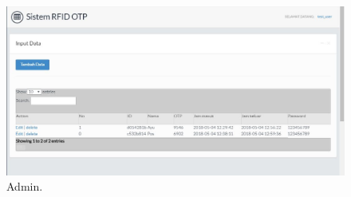 \begin{figure}[ht]
\begin{center}
\includegraphics[width=12cm]{figures/AdminOTP.JPG}
\end{center}
\caption{Admin.
\label{eq:30}}
\end{figure}  



